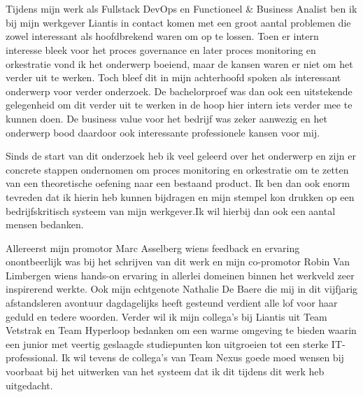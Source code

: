 
\chapter*{}%
\label{ch:voorwoord}
Tijdens mijn werk als Fullstack DevOps en Functioneel & Business Analist ben ik bij mijn werkgever Liantis in contact komen met een groot aantal problemen die zowel interessant als hoofdbrekend waren om op te lossen. Toen er intern interesse bleek voor het proces governance en later proces monitoring en orkestratie vond ik het onderwerp boeiend, maar de kansen waren er niet om het verder uit te werken. Toch bleef dit in mijn achterhoofd spoken als interessant onderwerp voor verder onderzoek. De bachelorproef was dan ook een uitstekende gelegenheid om dit verder uit te werken in de hoop hier intern iets verder mee te kunnen doen. De business value voor het bedrijf was zeker aanwezig en het onderwerp bood daardoor ook interessante professionele kansen voor mij.\newline

Sinds de start van dit onderzoek heb ik veel geleerd over het onderwerp en zijn er concrete stappen ondernomen om proces monitoring en orkestratie om te zetten van een theoretische oefening naar een bestaand product. Ik ben dan ook enorm tevreden dat ik hierin heb kunnen bijdragen en mijn stempel kon drukken op een bedrijfskritisch systeem van mijn werkgever.Ik wil hierbij dan ook een aantal mensen bedanken. \newline

Allereerst mijn promotor Marc Asselberg wiens feedback en ervaring onontbeerlijk was bij het schrijven van dit werk en mijn co-promotor Robin Van Limbergen wiens hands-on ervaring in allerlei domeinen binnen het werkveld zeer inspirerend werkte. Ook mijn echtgenote Nathalie De Baere die mij in dit vijfjarig afstandsleren avontuur dagdagelijks heeft gesteund verdient alle lof voor haar geduld en tedere woorden. Verder wil ik mijn collega's bij Liantis uit Team Vetstrak en Team Hyperloop bedanken om een warme omgeving te bieden waarin een junior met veertig geslaagde studiepunten kon uitgroeien tot een sterke IT-professional. Ik wil tevens de collega's van Team Nexus goede moed wensen bij voorbaat bij het uitwerken van het systeem dat ik dit tijdens dit werk heb uitgedacht.    